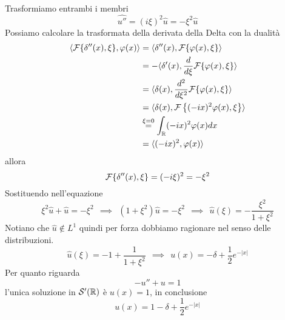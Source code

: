 Trasformiamo entrambi i membri
\begin{equation*}
\widehat{u''} =( i\xi )^{2}\hat{u} =-\xi ^{2}\hat{u}
\end{equation*}
Possiamo calcolare la trasformata della derivata della Delta con la dualità
\begin{align*}
\langle \mathcal{F} \{\delta ''( x) ,\xi \} ,\varphi ( x) \rangle  & =\langle \delta ''( x) ,\mathcal{F} \{\varphi ( x) ,\xi \} \rangle \\
 & =-\langle \delta '( x) ,\frac{d}{d\xi }\mathcal{F} \{\varphi ( x) ,\xi \} \rangle \\
 & =\langle \delta ( x) ,\frac{d^{2}}{d\xi ^{2}}\mathcal{F} \{\varphi ( x) ,\xi \} \rangle \\
 & =\langle \delta ( x) ,\mathcal{F} \left\{( -ix)^{2} \varphi ( x) ,\xi \right\} \rangle \\
 & \overset{\xi =0}{=}\int _{\mathbb{R}}( -ix)^{2} \varphi ( x) dx\\
 & =\langle ( -ix)^{2} ,\varphi ( x) \rangle 
\end{align*}
allora
\begin{equation*}
\mathcal{F} \{\delta ''( x) ,\xi \} =( -i\xi )^{2} =-\xi ^{2}
\end{equation*}
Sostituendo nell'equazione
\begin{equation*}
\xi ^{2}\hat{u} +\hat{u} =-\xi ^{2} \ \ \implies \ \ \left( 1+\xi ^{2}\right)\hat{u} =-\xi ^{2} \ \ \implies \ \ \hat{u}( \xi ) =-\frac{\xi ^{2}}{1+\xi ^{2}}
\end{equation*}
Notiano che $\hat{u} \notin L^{1}$ quindi per forza dobbiamo ragionare nel senso delle distribuzioni.
\begin{equation*}
\hat{u}( \xi ) =-1+\frac{1}{1+\xi ^{2}} \ \ \implies \ \ u( x) =-\delta +\frac{1}{2} e^{-| x| }
\end{equation*}
Per quanto riguarda
\begin{equation*}
-u''+u=1
\end{equation*}
l'unica soluzione in $\mathcal{S}  '(\mathbb{R})$ è $u( x) =1$, in conclusione
\begin{equation*}
u( x) =1-\delta +\frac{1}{2} e^{-| x| }
\end{equation*}
\Soluzione

